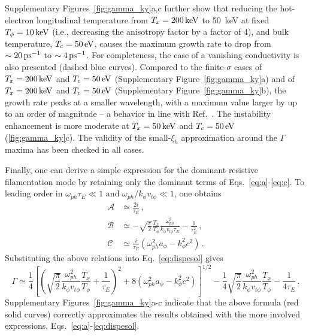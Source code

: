 \documentclass[aps,superscriptaddress]{revtex4}
\begin{document}
Supplementary Figures~\ref{fig:gamma_ky}a,c further show that reducing the hot-electron longitudinal temperature from $T_x=200\,\rm keV$ to 50~keV at fixed $T_\phi = 10\,\rm keV$ (i.e., decreasing the anisotropy factor by a factor of 4), and bulk temperature, $T_c=50\,\rm eV$, causes the maximum growth rate to drop from $\sim 20\,\rm ps^{-1}$ to $\sim 4\,\rm ps^{-1}$. 
For completeness, the case of a vanishing conductivity is also presented (dashed blue curves). Compared to the finite-$\sigma$ cases of $T_x=200\,\rm keV$ and $T_c=50\,\rm eV$ (Supplementary Figure~\ref{fig:gamma_ky}a) and of $T_x=200\,\rm keV$ and $T_c=50\,\rm eV$ (Supplementary Figure~\ref{fig:gamma_ky}b), the growth rate peaks at a smaller wavelength, with a maximum value larger by up to an order of magnitude -- a behavior in line with Ref.~\cite{POP_Gremillet_2002}. The instability enhancement is more moderate at $T_x=50\,\rm keV$ and $T_c=50\,\rm eV$ (\ref{fig:gamma_ky}c). The validity of the small-$\xi_h$ approximation around the $\Gamma$ maxima has been checked in all cases. 

Finally, one can derive a simple expression for the dominant resistive filamentation mode by retaining only the dominant terms of Eqs.~\eqref{eq:a}-\eqref{eq:c}. To leading order in $\omega_{ph} \tau_E \ll 1$ and $\omega_{ph}/k_\phi v_{t\phi} \ll 1$, one obtains
\begin{align}
\mathcal{A} & \simeq \frac{2i}{\tau_E}  \label{eq:a2} \,, \\
\mathcal{B} & \simeq - \sqrt{\frac{\pi}{2}}\frac{T_x }{T_\phi}\frac{\omega_{ph}^2}{k_\phi v_{t\phi} \tau_E}
 -\frac{1}{\tau_E^2} \,, \label{eq:b2} \\
\mathcal{C} & \simeq \frac{i}{\tau_E}(\omega_{ph}^2 a_\phi -k_\phi^2c^2 )\label{eq:c2} \,.
\end{align}
Substituting the above relations into Eq.~\eqref{eq:dispesol} gives
\begin{equation}
\Gamma \simeq \frac{1}{4}  \left[ \left( \sqrt{\frac{\pi}{2}} \frac{\omega_{ph}^2}{k_\phi v_{t\phi}}\frac{T_x}{T_\phi}    + \frac{1}{\tau_E} \right)^2 + 8(\omega_{ph}^2 a_\phi  - k_\phi^2 c^2 )\right]^{1/2} -\frac{1}{4} \sqrt{\frac{\pi}{2}} \frac{\omega_{ph}^2}{k_\phi v_{t\phi}}\frac{T_x}{T_\phi} - \frac{1}{4\tau_E}
\label{eq:dispesol2}\, .
\end{equation}
Supplementary Figures~\ref{fig:gamma_ky}a-c indicate that the above formula (red solid curves) correctly approximates the results obtained with the more involved expressions, Eqs.~\eqref{eq:a}-\eqref{eq:dispesol}. 
\end{document}
